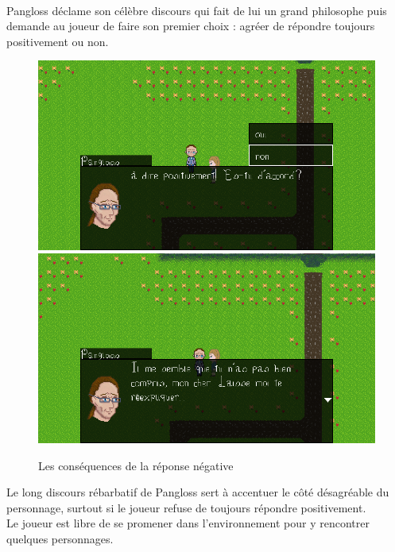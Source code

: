 \documentclass[11pt]{article}
\begin{document}
\paragraph{}
Pangloss déclame son célèbre discours qui fait de lui un grand philosophe puis demande au joueur de faire son premier choix : agréer de répondre toujours positivement ou non. \\

\begin{figure}[H]
\includegraphics[scale=0.35]{choix}
\includegraphics[scale=0.35]{gameplay4}
\centering
\caption{Les conséquences de la réponse négative}
\label{panChoix}
\end{figure}


Le long discours rébarbatif de Pangloss sert à accentuer le côté désagréable du personnage, surtout si le joueur refuse de toujours répondre positivement. \\
\newpage
Le joueur est libre de se promener dans l'environnement pour y rencontrer quelques personnages.
\end{document}
